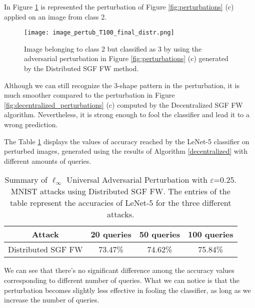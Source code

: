 In Figure \ref{fig:distributed} is represented the perturbation of Figure \ref{fig:perturbations} (c) applied on an image from class 2.

\begin{figure}[htbp]
	\centering
	\texttt{[image: image\_pertub\_T100\_final\_distr.png]}
	\caption{{\small Image belonging to class 2 but classified as 3 by using the adversarial perturbation in Figure \ref{fig:perturbations} (c) generated by the Distributed SGF FW method.}}
	\label{fig:distributed}
\end{figure}
Although we can still recognize the 3-shape pattern in the
perturbation, it is much smoother compared to the perturbation in Figure \ref{fig:decentralized_perturbations} (c) computed by the Decentralized
SGF FW algorithm. Nevertheless, it is strong enough to fool the classifier and lead it to a wrong prediction.

The Table \ref{tab:distributed} displays the values of accuracy reached by the LeNet-5 classifier on perturbed images, generated using the results of Algorithm \ref{decentralized} with different amounts of queries.\\
\begin{table}[htbp]
	\begin{center}
		\begin{adjustwidth}{-.6cm}{}
			\begin{tabular}{c|ccc}
				\textbf{Attack} &          20 \textbf{queries} &      50 \textbf{queries} &     100 \textbf{queries} \\
				\midrule
				{\small Distributed SGF FW}     &   73.47\% &    74.62\% &       75.84\% \\
			\end{tabular}
		\end{adjustwidth}
	\end{center}
	\caption{{\small Summary of $\ell_\infty$ Universal Adversarial Perturbation with $\varepsilon$=0.25. MNIST attacks using Distributed SGF FW. The entries of the table represent the accuracies of LeNet-5 for the three different attacks.}}
	\label{tab:distributed}
\end{table}

We can see that there's no significant
difference among the accuracy values corresponding to different number of queries. What we can notice is that the
perturbation becomes slightly less effective in fooling the classifier, as long as we increase the number of queries.